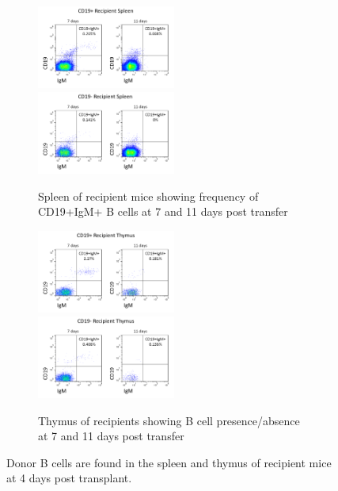 \begin{figure}
	\begin{subfigure}{\textwidth}
	\includegraphics[width=0.5\textwidth]{Figures/CD19posrecipspleen.png}
	\includegraphics[width=0.5\textwidth]{Figures/CD19negrecipspleen.png}
	\caption{Spleen of recipient mice showing frequency of CD19+IgM+ B cells at 7 and 11 days post transfer}
	\label{subfig:transferspleen}
	\end{subfigure}
	\begin{subfigure}{\textwidth}
	\includegraphics[width=0.5\textwidth]{Figures/CD19posrecipthy.png}
	\includegraphics[width=0.5\textwidth]{Figures/CD19negrecipthy.png}
	\caption{Thymus of recipients showing B cell presence/absence at 7 and 11 days post transfer}
	\label{subfig:transferthymus}
	\end{subfigure}
\caption[Donor B cells are found in the spleen and thymus of recipient mice at 4 days post transplant]{Donor B cells are found in the spleen and thymus of recipient mice at 4 days post transplant.
}
\end{figure}
